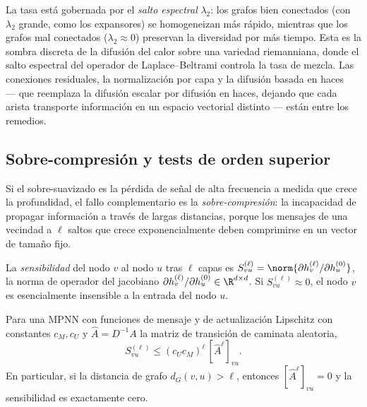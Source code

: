 La tasa est\'a gobernada por el \emph{salto espectral} $\lambda_2$: los grafos
bien conectados (con $\lambda_2$ grande, como los expansores) se homogeneizan m\'as
r\'apido, mientras que los grafos mal conectados ($\lambda_2 \approx 0$) preservan
la diversidad por m\'as tiempo. Esta es la sombra discreta de la difusi\'on del
calor sobre una variedad riemanniana, donde el salto espectral del operador de
Laplace--Beltrami controla la tasa de mezcla. Las conexiones residuales, la
normalizaci\'on por capa y la difusi\'on basada en haces~\citep{bodnar2022neural}
--- que reemplaza la difusi\'on escalar por difusi\'on en haces, dejando que cada
arista transporte informaci\'on en un espacio vectorial distinto --- est\'an entre
los remedios.

\subsection{Sobre-compresi\'on y tests de orden superior}
\label{sec:graphs:oversquashing}

Si el sobre-suavizado es la p\'erdida de se\~nal de alta frecuencia a medida que
crece la profundidad, el fallo complementario es la \emph{sobre-compresi\'on}: la
incapacidad de propagar informaci\'on a trav\'es de largas distancias, porque los
mensajes de una vecindad a $\ell$ saltos que crece exponencialmente deben
comprimirse en un vector de tama\~no fijo.

\begin{definition}
\label{def:graphs:sensitivity}
La \emph{sensibilidad} del nodo $v$ al nodo $u$ tras $\ell$ capas es
$S_{vu}^{(\ell)} = \norm{\partial h_v^{(\ell)} / \partial h_u^{(0)}}$, la norma de
operador del jacobiano $\partial h_v^{(\ell)} / \partial h_u^{(0)} \in
\R^{d \times d}$. Si $S_{vu}^{(\ell)} \approx 0$, el nodo $v$ es esencialmente
insensible a la entrada del nodo $u$.
\end{definition}

\begin{proposition}
\label{prop:graphs:oversquashing}
Para una MPNN con funciones de mensaje y de actualizaci\'on Lipschitz con
constantes $c_M, c_U$ y $\hat A = D^{-1} A$ la matriz de transici\'on de caminata
aleatoria,
\[
  S_{vu}^{(\ell)} \le (c_U c_M)^\ell\, [\hat A^\ell]_{vu}.
\]
En particular, si la distancia de grafo $d_G(v,u) > \ell$, entonces
$[\hat A^\ell]_{vu} = 0$ y la sensibilidad es exactamente cero.
\end{proposition}

